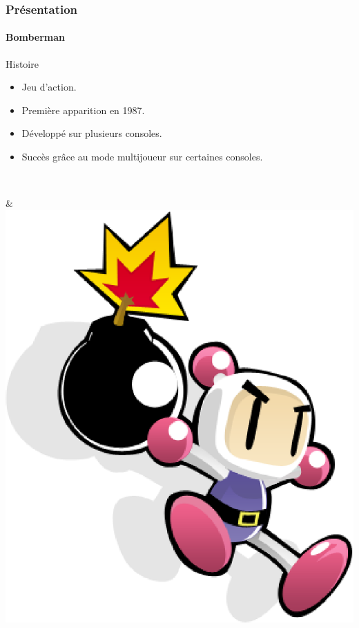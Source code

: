 \begin{frame}
\frametitle{Présentation}
\framesubtitle{Bomberman}
\begin{minipage}{7cm}
Histoire
	\begin{itemize}
		\item Jeu d'action.
		\item Première apparition en 1987.
		\item Développé sur plusieurs consoles.
		\item Succès grâce au mode multijoueur sur certaines consoles.
	\end{itemize} \\
\end{minipage} & \includegraphics[scale=0.3]{img/bomberman1.eps} 

\end{frame}




